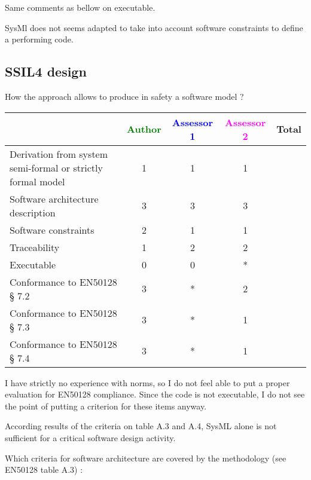 \begin{assessor2}
Same comments as bellow on executable.

SysMl does not seems adapted to take into account software constraints to define a performing code.
\end{assessor2}

\subsection{SSIL4 design}

How the approach allows to produce in safety a software model ?

\begin{tabular}{|l | c | c | c | c|}
\hline
& \textcolor{green}{Author} & \textcolor{blue}{Assessor 1} & \textcolor{magenta}{Assessor 2} & Total \\
\hline
Derivation from system semi-formal or strictly formal model & 1 & 1 & 1 & \\
\hline
Software architecture description & 3 & 3 & 3 & \\
\hline
Software constraints & 2 & 1 & 1 & \\
\hline
Traceability & 1 & 2 & 2 & \\
\hline
Executable & 0 & 0 & * & \\
\hline
Conformance to EN50128 § 7.2 & 3 & * & 2 & \\
\hline
Conformance to EN50128 § 7.3 & 3 & * & 1 & \\
\hline
Conformance to EN50128 § 7.4 & 3 & * & 1 & \\
\hline
\end{tabular}

\begin{assessor1}
I have strictly no experience with norms, so I do not feel able to put a proper evaluation for EN50128 compliance. Since the code is not executable, I do not see the point of putting a criterion for these items anyway. 
\end{assessor1}


\begin{assessor2}
According results of the criteria on table A.3 and A.4, SysML alone is not sufficient for a critical software design activity.
\end{assessor2}


Which criteria for software architecture are covered by the methodology
(see EN50128 table A.3) :

